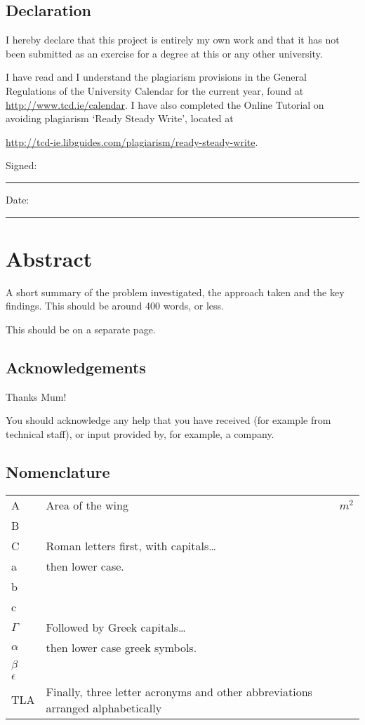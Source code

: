 \documentclass[a4paper,oneside,12pt]{book}
\title{\thesistitle}
\author{\authorname}
\begin{document}

\section*{\Huge{Declaration}}
\vspace{1cm}
I hereby declare that this project is entirely my own work and that it has not been submitted as an exercise for a degree at this or any other university.

\vspace{1cm}
I have read and I understand the plagiarism provisions in the General Regulations of the University Calendar for the current year, found at \url{http://www.tcd.ie/calendar}.
\vspace{1cm}
I have also completed the Online Tutorial on avoiding plagiarism `Ready Steady Write', located at

\url{http://tcd-ie.libguides.com/plagiarism/ready-steady-write}.
\vspace{3cm}

Signed:~\rule{5cm}{0.3pt}\hfill Date:~\rule{5cm}{0.3pt}

\chapter*{Abstract}
A short summary of the problem investigated, the approach taken and the key findings. This should be around 400 words, or less.

This should be on a separate page.

\newpage
\onehalfspacing\raggedright %

\section*{\Huge{Acknowledgements}}
Thanks Mum!

You should acknowledge any help that you have received (for example from technical staff), or input provided by, for example, a company.
\tableofcontents
\listoffigures
\listoftables
\newpage
\section*{\Huge{Nomenclature}}
\begin{tabular}{lp{9cm}l}
A&Area of the wing&$m^{2}$\\
B\\
C& Roman letters first, with capitals\ldots\\
a&then lower case.\\
b\\
c\\
$\Gamma$&Followed by Greek capitals\ldots\\
$\alpha$&then lower case greek symbols.\\
$\beta$\\
$\epsilon$\\
TLA&Finally, three letter acronyms and other abbreviations arranged alphabetically\\
\end{tabular}
\vspace{2cm}
\end{document}
